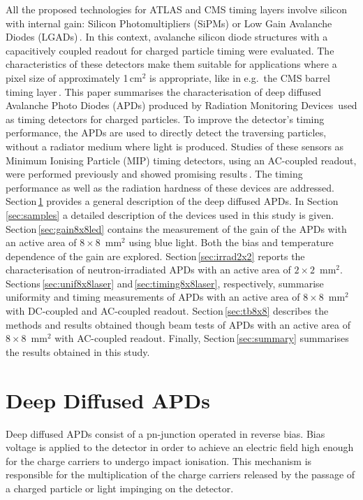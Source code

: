 \documentclass[review,number,sort&compress]{elsarticle}
\begin{document}
All the proposed technologies for ATLAS and CMS timing layers involve silicon with internal gain: Silicon Photomultipliers (SiPMs) or Low Gain Avalanche Diodes (LGADs)\,\cite{cmsMIPtiming,atlasMIPtiming}.
In this context, avalanche silicon diode structures with a capacitively coupled readout for charged particle timing were evaluated.
The characteristics of these detectors make them suitable for applications where a pixel size of approximately 1\,cm$^{2}$ is appropriate, like in e.g.\ the CMS barrel timing layer\,\cite{cmsMIPtiming}.
This paper summarises the characterisation of deep diffused Avalanche Photo Diodes (APDs) produced by Radiation Monitoring Devices\,\cite{rmdAddress} used as timing detectors for charged particles.
To improve the detector's timing performance, the APDs are used to directly detect the traversing particles, without a radiator medium where light is produced.
Studies of these sensors as Minimum Ionising Particle (MIP) timing detectors, using an AC-coupled readout, were performed previously and showed promising results\,\cite{white2014}.
The timing performance as well as the radiation hardness of these devices are addressed.
Section\,\ref{sec:ddApds} provides a general description of the deep diffused APDs.
In Section\,\ref{sec:samples} a detailed description of the devices used in this study is given.
Section\,\ref{sec:gain8x8led} contains the measurement of the gain of the APDs with an active area of $8 \times 8$~mm$^2$ using blue light. Both the bias and temperature dependence of the gain are explored.
Section\,\ref{sec:irrad2x2} reports the characterisation of neutron-irradiated APDs with an active area of $2 \times 2$~mm$^2$.
Sections\,\ref{sec:unif8x8laser} and\,\ref{sec:timing8x8laser}, respectively, summarise uniformity and timing measurements of APDs with an active area of $8 \times 8$~mm$^2$ with DC-coupled and AC-coupled readout.
Section\,\ref{sec:tb8x8} describes the methods and results obtained though beam tests of APDs with an active area of $8 \times 8$~mm$^2$ with AC-coupled readout.
Finally, Section\,\ref{sec:summary} summarises the results obtained in this study.


\section{Deep Diffused APDs}
\label{sec:ddApds}

Deep diffused APDs consist of a pn-junction operated in reverse bias.
Bias voltage is applied to the detector in order to achieve an electric field high enough for the charge carriers to undergo impact ionisation.
This mechanism is responsible for the multiplication of the charge carriers released by the passage of a charged particle or light impinging on the detector.
\end{document}
